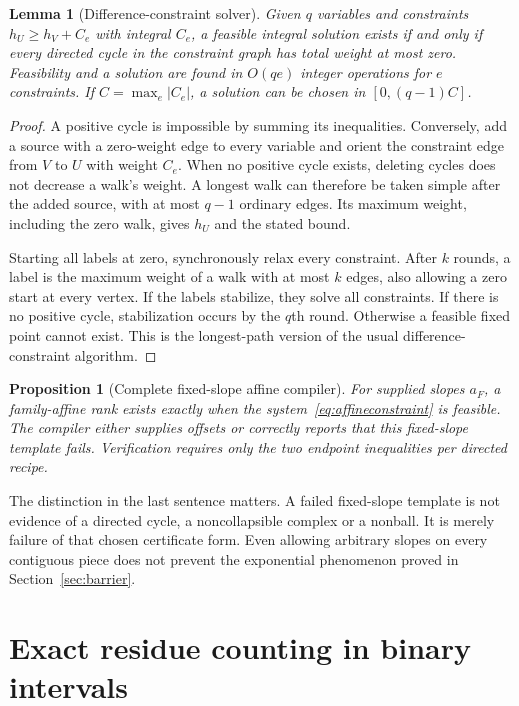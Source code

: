 \documentclass[11pt,letterpaper]{article}
\newtheorem{lemma}[theorem]{Lemma}
\newtheorem{proposition}[theorem]{Proposition}
\theoremstyle{definition}
\theoremstyle{remark}\newtheorem{remark}[theorem]{Remark}
\begin{document}
\begin{lemma}[Difference-constraint solver]
\label{lem:offset}
Given $q$ variables and constraints $h_U\geq h_V+C_e$ with integral $C_e$, a feasible integral solution exists if and only if every directed cycle in the constraint graph has total weight at most zero. Feasibility and a solution are found in $O(qe)$ integer operations for $e$ constraints. If $C=\max_e|C_e|$, a solution can be chosen in $[0,(q-1)C]$.
\end{lemma}
\begin{proof}
A positive cycle is impossible by summing its inequalities. Conversely, add a source with a zero-weight edge to every variable and orient the constraint edge from $V$ to $U$ with weight $C_e$. When no positive cycle exists, deleting cycles does not decrease a walk's weight. A longest walk can therefore be taken simple after the added source, with at most $q-1$ ordinary edges. Its maximum weight, including the zero walk, gives $h_U$ and the stated bound.

Starting all labels at zero, synchronously relax every constraint. After $k$ rounds, a label is the maximum weight of a walk with at most $k$ edges, also allowing a zero start at every vertex. If the labels stabilize, they solve all constraints. If there is no positive cycle, stabilization occurs by the $q$th round. Otherwise a feasible fixed point cannot exist. This is the longest-path version of the usual difference-constraint algorithm.
\end{proof}

\begin{proposition}[Complete fixed-slope affine compiler]
\label{prop:affine}
For supplied slopes $a_F$, a family-affine rank exists exactly when the system~\eqref{eq:affineconstraint} is feasible. The compiler either supplies offsets or correctly reports that this fixed-slope template fails. Verification requires only the two endpoint inequalities per directed recipe.
\end{proposition}

The distinction in the last sentence matters. A failed fixed-slope template is not evidence of a directed cycle, a noncollapsible complex or a nonball. It is merely failure of that chosen certificate form. Even allowing arbitrary slopes on every contiguous piece does not prevent the exponential phenomenon proved in Section~\ref{sec:barrier}.

\section{Exact residue counting in binary intervals}
\label{sec:floor}
\end{document}
